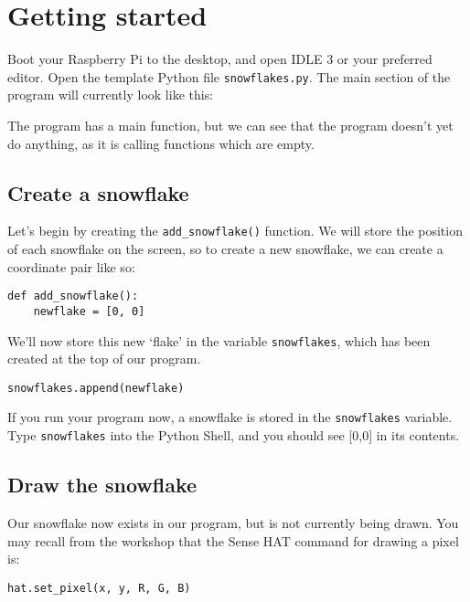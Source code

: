 \section{Getting started}

Boot your Raspberry Pi to the desktop, and open IDLE 3 or your preferred editor. Open the template Python file \texttt{snowflakes.py}. The main section of the program will currently look like this:



The program has a main function, but we can see that the program doesn't yet do anything, as it is calling functions which are empty.

\subsection*{Create a snowflake}

Let's begin by creating the \texttt{add\_snowflake()} function. We will store the position of each snowflake on the screen, so to create a new snowflake, we can create a coordinate pair like so:

\begin{lstlisting}[style=Python]
def add_snowflake():
	newflake = [0, 0]
\end{lstlisting}

We'll now store this new `flake' in the variable \texttt{snowflakes}, which has been created at the top of our program.

\begin{lstlisting}[style=Python, firstnumber=3]
	snowflakes.append(newflake)
\end{lstlisting}

If you run your program now, a snowflake is stored in the \texttt{snowflakes} variable. Type \texttt{snowflakes} into the Python Shell, and you should see [0,0] in its contents.

\subsection*{Draw the snowflake}

Our snowflake now exists in our program, but is not currently being drawn. You may recall from the workshop that the Sense HAT command for drawing a pixel is:

\begin{lstlisting}[style=Python, numbers=none]
hat.set_pixel(x, y, R, G, B)
\end{lstlisting}

